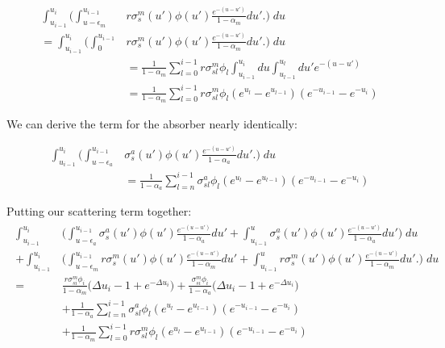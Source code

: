 \documentclass{article}
\begin{document}
         \begin{align}
             \int_{u_{i-1}}^{u_{i}} 
            \bigg(  
                \int_{u - \epsilon_m}^{u_{i-1}} &r \sigma_s^m(u')\phi(u') \frac{e^{-(u-u')}}{1 - \alpha_m}du'.
            \bigg)  \; du   \\ =
             \int_{u_{i-1}}^{u_{i}} 
            \bigg(  
                \int_{0}^{u_{i-1}} &r \sigma_s^m(u')\phi(u') \frac{e^{-(u-u')}}{1 - \alpha_m}du'.
            \bigg)  \; du   \\ &=
            \frac{1}{1-\alpha_m} \sum_{l = 0}^{i-1} r \sigma_{sl}^m \phi_l 
            \int_{u_{i-1}}^{u_{i}} du \int_{u_{l-1}}^{u_{l}} du' e^{-(u-u')} \\ &=
            \frac{1}{1-\alpha_m} 
            \sum_{l = 0}^{i-1} r \sigma_{sl}^m \phi_l  (e^{u_l} - e^{u_{l-1}}) (e^{-u_{i-1}} - e^{-u_{i}}) 
         \end{align}

         We can derive the term for the absorber nearly identically:

         \begin{align}
             \int_{u_{i-1}}^{u_{i}} 
            \bigg(  
                \int_{u - \epsilon_a}^{u_{i-1}} & \sigma_s^a(u')\phi(u') \frac{e^{-(u-u')}}{1 - \alpha_a}du'.
            \bigg)  \; du   \\ &=
            \frac{1}{1-\alpha_a} \sum_{l = n}^{i-1} \sigma_{sl}^a \phi_l  (e^{u_l} - e^{u_{l-1}}) (e^{-u_{i-1}} - e^{-u_{i}}) 
         \end{align}

         Putting our scattering term together:
        \begin{align}
        \begin{split}
            \int_{u_{i-1}}^{u_{i}} &
            \bigg(  
                \int_{u - \epsilon_a}^{u_{i-1}} \sigma_s^a(u')\phi(u') \frac{e^{-(u-u')}}{1 - \alpha_a}du'  +
                \int_{u_{i-1}}^{u} \sigma_s^a(u')\phi(u') \frac{e^{-(u-u')}}{1 - \alpha_a}du'  
            \bigg)  \; du \\ +
            \int_{u_{i-1}}^{u_{i}} &
            \bigg(  
                \int_{u - \epsilon_m}^{u_{i-1}} r \sigma_s^m(u')\phi(u') \frac{e^{-(u-u')}}{1 - \alpha_m}du' +
                \int_{u_{i-1}}^{u} r \sigma_s^m(u')\phi(u') \frac{e^{-(u-u')}}{1 - \alpha_m}du'.
            \bigg)  \; du  \\ = 
            &\frac{r \sigma_{si}^m \phi_i}{1-\alpha_m} \big( \Delta u_i -1 + e^{-\Delta u_i} \big)+
            \frac{\sigma_{si}^m \phi_i}{1-\alpha_a} \big( \Delta u_i -1 + e^{-\Delta u_i} \big) \\ 
            & + \frac{1}{1-\alpha_a} 
                \sum_{l = n}^{i-1} \sigma_{sl}^a \phi_l  (e^{u_l} - e^{u_{l-1}})   (e^{-u_{i-1}} - e^{-u_{i}}) \\ 
            & + \frac{1}{1-\alpha_m} 
                \sum_{l = 0}^{i-1} r \sigma_{sl}^m \phi_l  (e^{u_l} - e^{u_{l-1}}) (e^{-u_{i-1}} - e^{-u_{i}}) 
        \end{split}
        \end{align}
\end{document}
